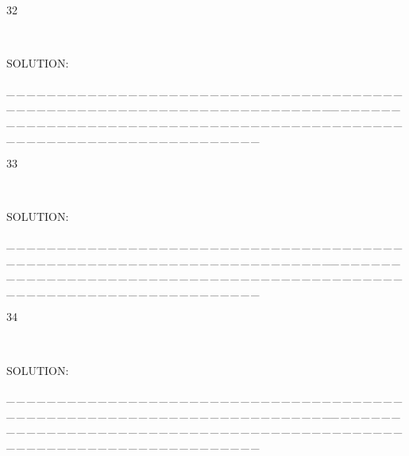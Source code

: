 \documentclass[a4paper, 11pt, UTF8]{article}
\begin{document}
\begin{large}
{\timesbf\Large 32} {\timessl\Large 
}\par\quad\,
{\timessl\Large
}\par
{\timesbf S\footnotesize{OLUTION:}}\par\quad

\par
{\tiny \_\,\_\,\_\,\_\,\_\,\_\,\_\,\_\,\_\,\_\,\_\,\_\,\_\,\_\,\_\,\_\,\_\,\_\,\_\,\_\,\_\,\_\,\_\,\_\,\_\,\_\,\_\,\_\,\_\,\_\,\_\,\_\,\_\,\_\,\_\,\_\,\_\,\_\,\_\,\_\,\_\,\_\,\_\,\_\,\_\,\_\,\_\,\_\,\_\,\_\,\_\,\_\,\_\,\_\,\_\,\_\,\_\,\_\,\_\,\_\,\_\,\_\,\_\,\_\,\_\,\_\,\_\,\_\,\_\,\_\,\_\_\,\_\,\_\,\_\,\_\,\_\,\_\,\_\,\_\,\_\,\_\,\_\,\_\,\_\,\_\,\_\,\_\,\_\,\_\,\_\,\_\,\_\,\_\,\_\,\_\,\_\,\_\,\_\,\_\,\_\,\_\,\_\,\_\,\_\,\_\,\_\,\_\,\_\,\_\,\_\,\_\,\_\,\_\,\_\,\_\,\_\,\_\,\_\,\_\,\_\,\_\,\_\,\_\,\_\,\_\,\_\,\_\,\_\,\_\,\_\,\_\,\_\,\_\,\_\,\_\,\_\,\_\,\_\,\_\,\_\,\_}\par

{\timesbf\Large 33} {\timessl\Large 
}\par\quad\,
{\timessl\Large
}\par
{\timesbf S\footnotesize{OLUTION:}}\par\quad

\par
{\tiny \_\,\_\,\_\,\_\,\_\,\_\,\_\,\_\,\_\,\_\,\_\,\_\,\_\,\_\,\_\,\_\,\_\,\_\,\_\,\_\,\_\,\_\,\_\,\_\,\_\,\_\,\_\,\_\,\_\,\_\,\_\,\_\,\_\,\_\,\_\,\_\,\_\,\_\,\_\,\_\,\_\,\_\,\_\,\_\,\_\,\_\,\_\,\_\,\_\,\_\,\_\,\_\,\_\,\_\,\_\,\_\,\_\,\_\,\_\,\_\,\_\,\_\,\_\,\_\,\_\,\_\,\_\,\_\,\_\,\_\,\_\_\,\_\,\_\,\_\,\_\,\_\,\_\,\_\,\_\,\_\,\_\,\_\,\_\,\_\,\_\,\_\,\_\,\_\,\_\,\_\,\_\,\_\,\_\,\_\,\_\,\_\,\_\,\_\,\_\,\_\,\_\,\_\,\_\,\_\,\_\,\_\,\_\,\_\,\_\,\_\,\_\,\_\,\_\,\_\,\_\,\_\,\_\,\_\,\_\,\_\,\_\,\_\,\_\,\_\,\_\,\_\,\_\,\_\,\_\,\_\,\_\,\_\,\_\,\_\,\_\,\_\,\_\,\_\,\_\,\_\,\_}\par

{\timesbf\Large 34} {\timessl\Large 
}\par\quad\,
{\timessl\Large
}\par
{\timesbf S\footnotesize{OLUTION:}}\par\quad

\par
{\tiny \_\,\_\,\_\,\_\,\_\,\_\,\_\,\_\,\_\,\_\,\_\,\_\,\_\,\_\,\_\,\_\,\_\,\_\,\_\,\_\,\_\,\_\,\_\,\_\,\_\,\_\,\_\,\_\,\_\,\_\,\_\,\_\,\_\,\_\,\_\,\_\,\_\,\_\,\_\,\_\,\_\,\_\,\_\,\_\,\_\,\_\,\_\,\_\,\_\,\_\,\_\,\_\,\_\,\_\,\_\,\_\,\_\,\_\,\_\,\_\,\_\,\_\,\_\,\_\,\_\,\_\,\_\,\_\,\_\,\_\,\_\_\,\_\,\_\,\_\,\_\,\_\,\_\,\_\,\_\,\_\,\_\,\_\,\_\,\_\,\_\,\_\,\_\,\_\,\_\,\_\,\_\,\_\,\_\,\_\,\_\,\_\,\_\,\_\,\_\,\_\,\_\,\_\,\_\,\_\,\_\,\_\,\_\,\_\,\_\,\_\,\_\,\_\,\_\,\_\,\_\,\_\,\_\,\_\,\_\,\_\,\_\,\_\,\_\,\_\,\_\,\_\,\_\,\_\,\_\,\_\,\_\,\_\,\_\,\_\,\_\,\_\,\_\,\_\,\_\,\_\,\_}\par


\end{large}
\end{document}
